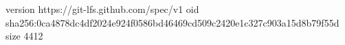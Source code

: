 version https://git-lfs.github.com/spec/v1
oid sha256:0ca4878dc4df2024e924f0586bd46469cd509c2420e1c327c903a15d8b79f55d
size 4412
